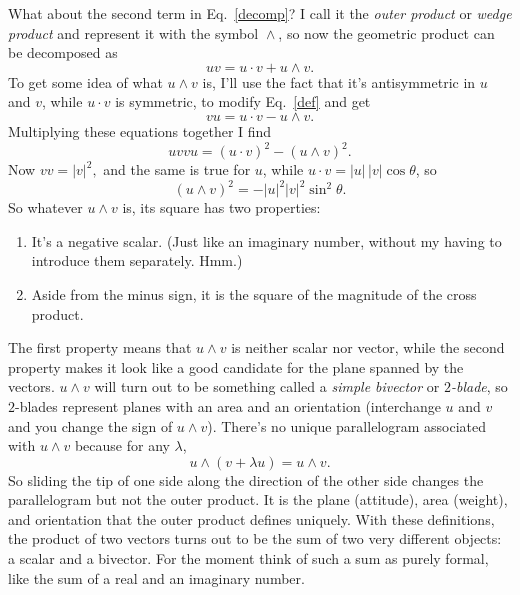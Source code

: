 \documentclass{utarticle}
\DeclareMathOperator{\inp}{\cdot}
\DeclareMathOperator{\out}{\wedge}
\begin{document}
What about the second term in Eq.~\eqref{decomp}?  I call it the \emph{outer product} or
\emph{wedge product} and represent it with the symbol $\out$, so now the geometric
product can be decomposed as
\begin{equation} uv = u \inp v + u \out v. \label{def} \end{equation} 
To get some idea of what $u \out v$ is, I'll use the fact that it's antisymmetric in 
$u$ and $v$, while $u \inp v$ is symmetric, to modify Eq.~\eqref{def} and get
\begin{equation} vu = u \inp v - u \out v. \end{equation}
Multiplying these equations together I find
\begin{equation}
uvvu = (u \inp v)^2 - (u \out v)^2.
\label{prodsq}
\end{equation}
Now $vv = |v|^2,$ and the same is true for $u$, while $u \inp v =
|u|\,|v|\cos\theta$, so
\begin{equation}
(u \out v)^2 = -|u|^2|v|^2\sin^2\theta.
\end{equation}
So whatever $u \out v$ is, its square has two properties:
\begin{enumerate}
\item It's a negative scalar.  (Just like an imaginary number, without my having
          to introduce them separately.  Hmm.)
\item Aside from the minus sign, it is the square of the magnitude of the 
          cross product.
\end{enumerate}
The first property means that $u \out v$ is neither scalar nor vector, while the second 
property makes it look like a good candidate for the plane spanned by the vectors.  
$u \out v$ will turn out to be something called a \emph{simple bivector} or 
\emph{$2$-blade}, so $2$-blades represent planes with an area and 
an orientation (interchange $u$ and $v$ and you change the sign of $u 
\out v$).  There's no unique parallelogram associated with $u \out 
v$ because for any $\lambda$,
\begin{equation}
u \out (v + \lambda u) = u \out v.
\end{equation}
So sliding the tip of one side along the direction of the other side 
changes the parallelogram but not the outer product.  
It is the plane (attitude), area (weight), and orientation that the outer 
product defines uniquely.  With these definitions, the product of two 
vectors turns out to be the sum of two very different objects: a scalar 
and a bivector.  For the moment think of such a sum as purely formal, 
like the sum of a real and an imaginary number.
\end{document}
